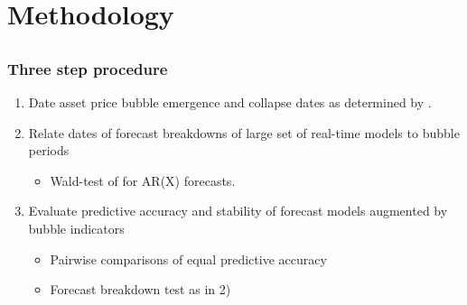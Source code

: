 \documentclass [handout] {beamer} %
\begin{document}

\section{Methodology}
\subsection{}

\begin{frame}
\frametitle{Three step procedure}
	\begin{enumerate}
	\item  Date asset price bubble emergence and collapse dates as determined by \cite{psy13}.
	\item Relate dates of forecast breakdowns of large set of real-time models to bubble periods
	\begin{itemize}
		\item Wald-test of \cite{gr09} for AR(X) forecasts.
	\end{itemize}
	\item Evaluate predictive accuracy and stability of forecast models augmented by bubble indicators
	\begin{itemize}
		\item Pairwise comparisons of equal predictive accuracy
		\item Forecast breakdown test as in 2)
	\end{itemize}
	\end{enumerate}
\end{frame}
\end{document}

